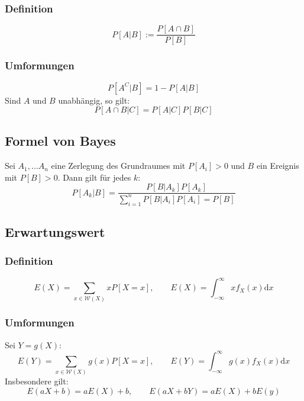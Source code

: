 \documentclass[a4paper,titlepage]{article}
\renewcommand{\d}{\mathrm{d}}
\begin{document}
\subsubsection{Definition}
\begin{equation*}
P[A|B] := \frac{P[A \cap B]}{P[B]}
\end{equation*}
\subsubsection{Umformungen}
\begin{equation*}
P[A^C|B] = 1 - P[A|B]
\end{equation*}
Sind $A$ und $B$ unabhängig, so gilt:
\begin{equation*}
P[A \cap B |C] = P[A|C]P[B|C]
\end{equation*}

\subsection{Formel von Bayes}
Sei $A_1, \dots A_n$ eine Zerlegung des Grundraumes mit $P[A_i] > 0$ und $B$ ein Ereignis mit $P[B] > 0$. Dann gilt für jedes $k$:
\begin{equation*}
P[A_k|B] = \frac{P[B|A_k] P[A_k] } {\sum\limits_{i=1}^{n} P[B|A_i]P[A_i] = P[B]}
\end{equation*}

\subsection{Erwartungswert}
\subsubsection{Definition}
\begin{equation*}
E(X) = \sum_{x \in \mathcal{W}(X)} x P[X = x], \qquad E(X) = \int_{-\infty}^\infty x f_X(x) \d x
\end{equation*}
\subsubsection{Umformungen}
Sei $Y = g(X)$:
\begin{equation*}
E(Y) = \sum_{x \in \mathcal{W}(X)} g(x) P[X = x], \qquad E(Y) = \int_{-\infty}^\infty g(x) f_X(x) \d x
\end{equation*}
Insbesondere gilt:
\begin{equation*}
E(a X+b) = a E(X) + b, \qquad E(aX + bY) = aE(X) + bE(y)
\end{equation*}
\end{document}
